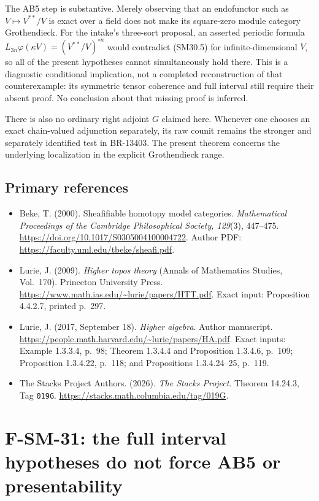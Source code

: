 \documentclass[11pt,a4paper]{article}
\theoremstyle{definition}\newtheorem{definition}[theorem]{Definition}
\theoremstyle{remark}\newtheorem{remark}[theorem]{Remark}
\begin{document}
The AB5 step is substantive.  Merely observing that an
endofunctor such as \(V\mapsto V^{**}/V\) is exact over a field
does not make its square-zero module category Grothendieck.
For the intake's three-sort proposal, an asserted periodic
formula \(L_{3n}\varphi(\kappa V)=(V^{**}/V)^{\circ n}\)
would contradict (SM30.5) for infinite-dimensional \(V\),
so all of the present hypotheses cannot simultaneously hold
there.  This is a diagnostic conditional implication, not a
completed reconstruction of that counterexample: its symmetric
tensor coherence and full interval still require their absent
proof.  No conclusion about that missing proof is inferred.

There is also no ordinary right adjoint \(G\) claimed here.
Whenever one chooses an exact chain-valued adjunction separately,
its raw counit remains the stronger and separately identified
test in BR-13403.  The present theorem concerns the underlying
localization in the explicit Grothendieck range.

\subsection{Primary references}
\begin{itemize}
\item Beke, T. (2000). Sheafifiable homotopy model categories.
\emph{Mathematical Proceedings of the Cambridge Philosophical
Society, 129}(3), 447--475.
\url{https://doi.org/10.1017/S0305004100004722}.
Author PDF: \url{https://faculty.uml.edu/tbeke/sheafi.pdf}.
\item Lurie, J. (2009). \emph{Higher topos theory}
(Annals of Mathematics Studies, Vol.~170). Princeton University
Press. \url{https://www.math.ias.edu/~lurie/papers/HTT.pdf}.
Exact input: Proposition 4.4.2.7, printed p.~297.
\item Lurie, J. (2017, September 18). \emph{Higher algebra}.
Author manuscript.
\url{https://people.math.harvard.edu/~lurie/papers/HA.pdf}.
Exact inputs: Example 1.3.3.4, p.~98; Theorem 1.3.4.4 and
Proposition 1.3.4.6, p.~109; Proposition 1.3.4.22, p.~118; and Propositions
1.3.4.24--25, p.~119.
\item The Stacks Project Authors. (2026). \emph{The Stacks
Project}. Theorem 14.24.3, Tag \nolinkurl{019G}.
\url{https://stacks.math.columbia.edu/tag/019G}.
\end{itemize}


\section{F-SM-31: the full interval hypotheses do not force AB5 or presentability}
\end{document}
